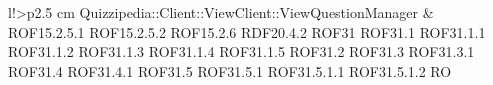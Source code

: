 \begin{tabella}{l!{\VRule}>{\centering\arraybackslash}p{2.5 cm}}
Quizzipedia::Client::ViewClient::ViewQuestionManager & ROF15.2.5.1 \linebreak ROF15.2.5.2 \linebreak ROF15.2.6 \linebreak RDF20.4.2 \linebreak ROF31 \linebreak ROF31.1 \linebreak ROF31.1.1 \linebreak ROF31.1.2 \linebreak ROF31.1.3 \linebreak ROF31.1.4 \linebreak ROF31.1.5 \linebreak ROF31.2 \linebreak ROF31.3 \linebreak ROF31.3.1 \linebreak ROF31.4 \linebreak ROF31.4.1 \linebreak ROF31.5 \linebreak ROF31.5.1 \linebreak ROF31.5.1.1 \linebreak ROF31.5.1.2 \linebreak RO
\end{tabella}
